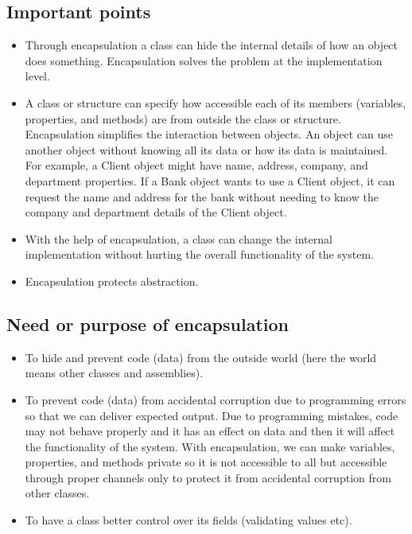 \subsection*{Important points}
\begin{itemize}
	\item Through encapsulation a class can hide the internal details of how an object does
	something. Encapsulation solves the problem at the implementation level.
	
	\item A class or structure can specify how accessible each of its members (variables,
	properties, and methods) are from outside the class or structure. Encapsulation
	simplifies the interaction between objects. An object can use another object without
	knowing all its data or how its data is maintained. For example, a Client object might
	have name, address, company, and department properties. If a Bank object wants
	to use a Client object, it can request the name and address for the bank without
	needing to know the company and department details of the Client object.
	
	\item With the help of encapsulation, a class can change the internal implementation
	without hurting the overall functionality of the system.
	
	\item Encapsulation protects abstraction.
\end{itemize}


\subsection*{Need or purpose of encapsulation}
\begin{itemize}
	\item To hide and prevent code (data) from the outside world (here the world means other
	classes and assemblies).
	
	\item To prevent code (data) from accidental corruption due to programming errors so
	that we can deliver expected output. Due to programming mistakes, code may not
	behave properly and it has an effect on data and then it will affect the functionality of
	the system. With encapsulation, we can make variables, properties, and methods
	private so it is not accessible to all but accessible through proper channels only to
	protect it from accidental corruption from other classes.
	
	\item To have a class better control over its fields (validating values etc).
\end{itemize}

